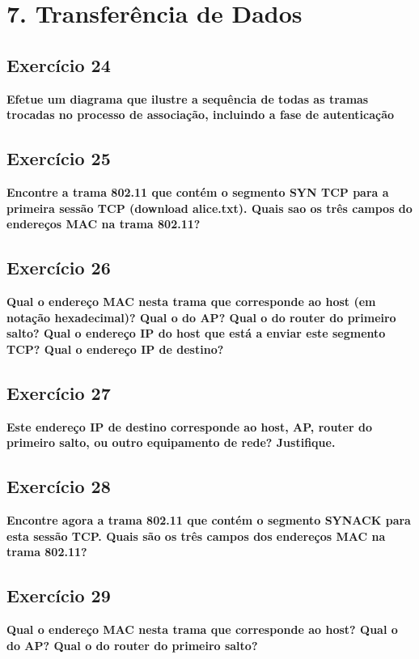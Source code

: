 \documentclass[a4paper]{report}
\begin{document}
\chapter{7. Transferência de Dados}
\section{Exercício 24}
\textbf{Efetue um diagrama que ilustre a sequência de todas as tramas trocadas
    no processo de associação, incluindo a fase de autenticação}\\

\section{Exercício 25}
\textbf{Encontre a trama 802.11 que contém o segmento SYN TCP para a primeira
    sessão TCP (download alice.txt). Quais sao os três campos do endereços MAC
    na trama 802.11?}\\

\section{Exercício 26}
\textbf{Qual o endereço MAC nesta trama que corresponde ao host (em notação
    hexadecimal)? Qual o do AP? Qual o do router do primeiro salto? Qual o
    endereço IP do host que está a enviar este segmento TCP? Qual o endereço IP
    de destino?}\\

\section{Exercício 27}
\textbf{Este endereço IP de destino corresponde ao host, AP, router do primeiro
    salto, ou outro equipamento de rede? Justifique.}\\

\section{Exercício 28}
\textbf{Encontre agora a trama 802.11 que contém o segmento SYNACK para esta
    sessão TCP. Quais são os três campos dos endereços MAC na trama 802.11?}\\

\section{Exercício 29}
\textbf{Qual o endereço MAC nesta trama que corresponde ao host? Qual o do AP?
    Qual o do router do primeiro salto?}\\
\end{document}
